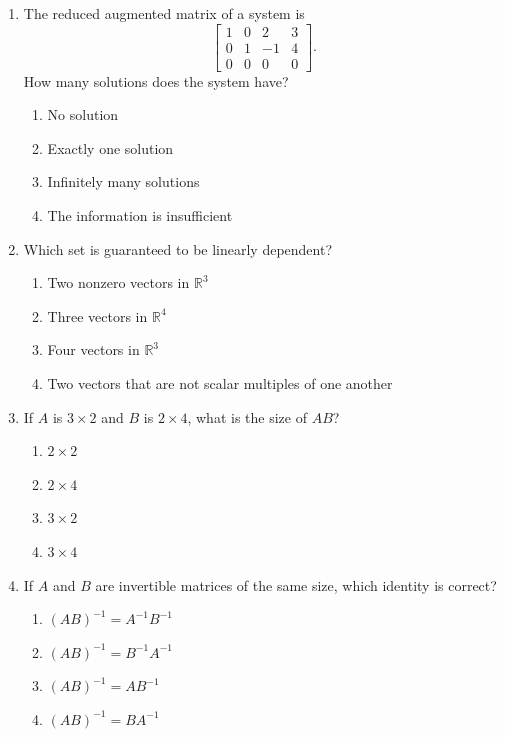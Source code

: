 \documentclass[11pt]{article}
\newif\ifshowsolutions
\newcommand{\R}{\mathbb{R}}
\newcommand{\solution}[1]{%
  \ifshowsolutions
    \par\medskip
    {\color{solutionblue}\textbf{Solution.} #1}
    \par\medskip
  \fi}
\begin{document}
\begin{enumerate}
\item The reduced augmented matrix of a system is
\[
\left[\begin{array}{ccc|c}
1&0&2&3\\
0&1&-1&4\\
0&0&0&0
\end{array}\right].
\]
How many solutions does the system have?
\begin{enumerate}[label=\Alph*.]
  \item No solution
  \item Exactly one solution
  \item Infinitely many solutions
  \item The information is insufficient
\end{enumerate}
\solution{\textbf{C.} The third variable is free and the system is consistent.}

\item Which set is guaranteed to be linearly dependent?
\begin{enumerate}[label=\Alph*.]
  \item Two nonzero vectors in $\R^3$
  \item Three vectors in $\R^4$
  \item Four vectors in $\R^3$
  \item Two vectors that are not scalar multiples of one another
\end{enumerate}
\solution{\textbf{C.} Four vectors in $\R^3$ give more vectors than entries.}

\item If $A$ is $3\times2$ and $B$ is $2\times4$, what is the size of $AB$?
\begin{enumerate}[label=\Alph*.]
  \item $2\times2$
  \item $2\times4$
  \item $3\times2$
  \item $3\times4$
\end{enumerate}
\solution{\textbf{D.} The inner dimensions match and the outer dimensions are $3\times4$.}

\item If $A$ and $B$ are invertible matrices of the same size, which identity is correct?
\begin{enumerate}[label=\Alph*.]
  \item $(AB)^{-1}=A^{-1}B^{-1}$
  \item $(AB)^{-1}=B^{-1}A^{-1}$
  \item $(AB)^{-1}=AB^{-1}$
  \item $(AB)^{-1}=BA^{-1}$
\end{enumerate}
\solution{\textbf{B.} The inverse reverses the order of the factors.}


\end{enumerate}
\end{document}
